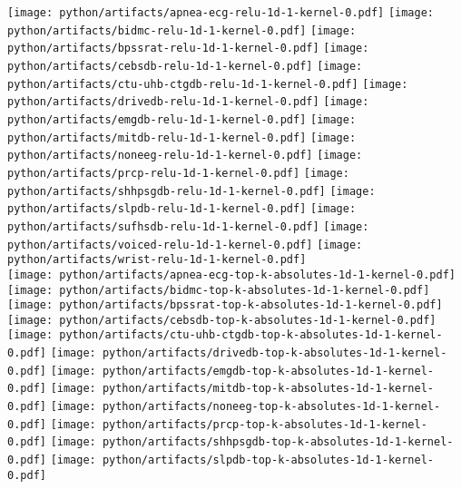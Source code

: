 \documentclass[journal]{IEEEtran}
\begin{document}
\begin{figure*}[!t]
	\centering
	\texttt{[image: python/artifacts/apnea-ecg-relu-1d-1-kernel-0.pdf]}
	\texttt{[image: python/artifacts/bidmc-relu-1d-1-kernel-0.pdf]}
	\texttt{[image: python/artifacts/bpssrat-relu-1d-1-kernel-0.pdf]}
	\texttt{[image: python/artifacts/cebsdb-relu-1d-1-kernel-0.pdf]}
	\texttt{[image: python/artifacts/ctu-uhb-ctgdb-relu-1d-1-kernel-0.pdf]}
	\texttt{[image: python/artifacts/drivedb-relu-1d-1-kernel-0.pdf]}
	\texttt{[image: python/artifacts/emgdb-relu-1d-1-kernel-0.pdf]}
	\texttt{[image: python/artifacts/mitdb-relu-1d-1-kernel-0.pdf]}
	\texttt{[image: python/artifacts/noneeg-relu-1d-1-kernel-0.pdf]}
	\texttt{[image: python/artifacts/prcp-relu-1d-1-kernel-0.pdf]}
	\texttt{[image: python/artifacts/shhpsgdb-relu-1d-1-kernel-0.pdf]}
	\texttt{[image: python/artifacts/slpdb-relu-1d-1-kernel-0.pdf]}
	\texttt{[image: python/artifacts/sufhsdb-relu-1d-1-kernel-0.pdf]}
	\texttt{[image: python/artifacts/voiced-relu-1d-1-kernel-0.pdf]}
	\texttt{[image: python/artifacts/wrist-relu-1d-1-kernel-0.pdf]}
	\\
	\texttt{[image: python/artifacts/apnea-ecg-top-k-absolutes-1d-1-kernel-0.pdf]}
	\texttt{[image: python/artifacts/bidmc-top-k-absolutes-1d-1-kernel-0.pdf]}
	\texttt{[image: python/artifacts/bpssrat-top-k-absolutes-1d-1-kernel-0.pdf]}
	\texttt{[image: python/artifacts/cebsdb-top-k-absolutes-1d-1-kernel-0.pdf]}
	\texttt{[image: python/artifacts/ctu-uhb-ctgdb-top-k-absolutes-1d-1-kernel-0.pdf]}
	\texttt{[image: python/artifacts/drivedb-top-k-absolutes-1d-1-kernel-0.pdf]}
	\texttt{[image: python/artifacts/emgdb-top-k-absolutes-1d-1-kernel-0.pdf]}
	\texttt{[image: python/artifacts/mitdb-top-k-absolutes-1d-1-kernel-0.pdf]}
	\texttt{[image: python/artifacts/noneeg-top-k-absolutes-1d-1-kernel-0.pdf]}
	\texttt{[image: python/artifacts/prcp-top-k-absolutes-1d-1-kernel-0.pdf]}
	\texttt{[image: python/artifacts/shhpsgdb-top-k-absolutes-1d-1-kernel-0.pdf]}
	\texttt{[image: python/artifacts/slpdb-top-k-absolutes-1d-1-kernel-0.pdf]}

\end{figure*}
\end{document}
